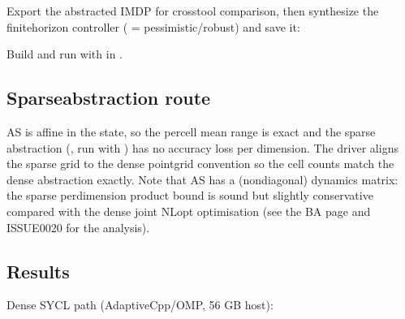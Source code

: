 \documentclass[a4paper,10pt,english]{sphinxmanual}
\begin{document}
\sphinxAtStartPar
Export the abstracted IMDP for cross\sphinxhyphen{}tool comparison, then synthesize the
finite\sphinxhyphen{}horizon controller ( = pessimistic/robust) and save it:

\begin{sphinxVerbatim}[commandchars=\\\{\}]
\end{sphinxVerbatim}

\sphinxAtStartPar
Build and run with  in .


\subsection{Sparse\sphinxhyphen{}abstraction route}
\label{\detokenize{benchmarks/AS:sparse-abstraction-route}}
\sphinxAtStartPar
AS is affine in the state, so the per\sphinxhyphen{}cell mean range is exact and the sparse
abstraction (, run with ) has no accuracy loss
per dimension. The driver aligns the sparse grid to the dense point\sphinxhyphen{}grid convention
so the cell counts match the dense abstraction exactly. Note that AS has a
 (non\sphinxhyphen{}diagonal) dynamics matrix: the sparse per\sphinxhyphen{}dimension product bound is
sound but slightly conservative compared with the dense joint NLopt optimisation
(see the BA page and ISSUE\sphinxhyphen{}0020 for the analysis).


\subsection{Results}
\label{\detokenize{benchmarks/AS:results}}
\sphinxAtStartPar
Dense SYCL path (AdaptiveCpp/OMP, 56 GB host):
\end{document}
